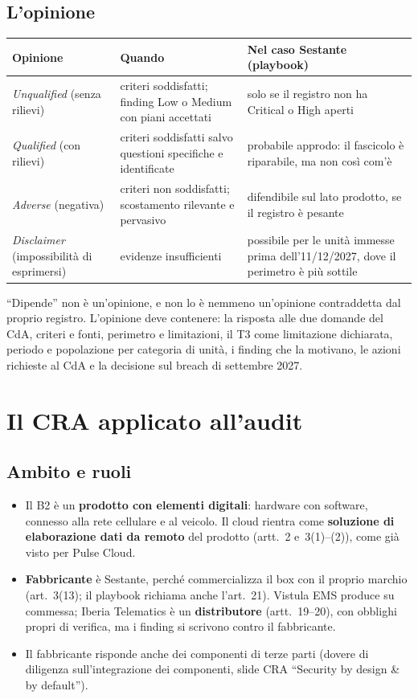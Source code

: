 \subsection{L'opinione}
\begin{center}
\small
\begin{tabularx}{\linewidth}{l X X}
\toprule
\textbf{Opinione} & \textbf{Quando} & \textbf{Nel caso Sestante (playbook)} \\ \midrule
\emph{Unqualified} (senza rilievi) & criteri soddisfatti; finding Low o Medium con piani accettati &
  solo se il registro non ha Critical o High aperti \\
\emph{Qualified} (con rilievi) & criteri soddisfatti salvo questioni specifiche e identificate &
  probabile approdo: il fascicolo è riparabile, ma non così com'è \\
\emph{Adverse} (negativa) & criteri non soddisfatti; scostamento rilevante e pervasivo & difendibile
  sul lato prodotto, se il registro è pesante \\
\emph{Disclaimer} (impossibilità di esprimersi) & evidenze insufficienti & possibile per le unità
  immesse prima dell'11/12/2027, dove il perimetro è più sottile \\
\bottomrule
\end{tabularx}
\end{center}
\noindent ``Dipende'' non è un'opinione, e non lo è nemmeno un'opinione contraddetta dal proprio
registro. L'opinione deve contenere: la risposta alle due domande del CdA, criteri e fonti, perimetro
e limitazioni, il T3 come limitazione dichiarata, periodo e popolazione per categoria di unità, i
finding che la motivano, le azioni richieste al CdA e la decisione sul breach di settembre 2027.

\section{Il CRA applicato all'audit}

\subsection{Ambito e ruoli}
\begin{itemize}
  \item Il B2 è un \textbf{prodotto con elementi digitali}: hardware con software, connesso alla rete
    cellulare e al veicolo. Il cloud rientra come \textbf{soluzione di elaborazione dati da remoto}
    del prodotto (artt.~2 e~3(1)--(2)), come già visto per Pulse Cloud.
  \item \textbf{Fabbricante} è Sestante, perché commercializza il box con il proprio marchio
    (art.~3(13); il playbook richiama anche l'art.~21). Vistula EMS produce su commessa; Iberia
    Telematics è un \textbf{distributore} (artt.~19--20), con obblighi propri di verifica, ma i
    finding si scrivono contro il fabbricante.
  \item Il fabbricante risponde anche dei componenti di terze parti (dovere di diligenza
    sull'integrazione dei componenti, slide CRA ``Security by design \& by default'').
\end{itemize}

